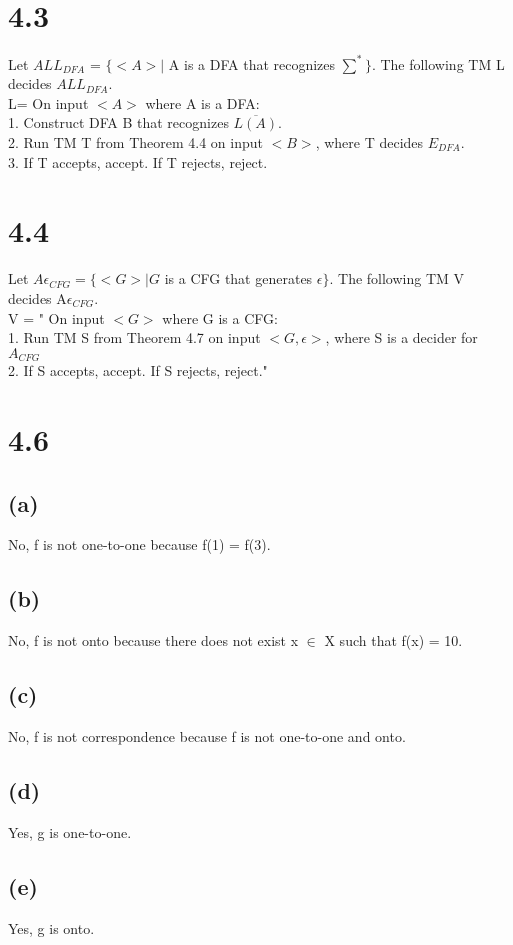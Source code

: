 \documentclass{scrartcl}
\begin{document}
\section*{4.3}
Let $ALL_{DFA}$ = $\{<A> \mid$ A is a DFA that recognizes $\sum^* \}$. The following TM L decides $ALL_{DFA}$.\\

L= On input $<A>$ where A is a DFA:\\
1. Construct DFA B that recognizes $\overline{L(A)}$.\\
2. Run TM T from Theorem 4.4 on input $<B>$, where T decides $E_{DFA}$.\\
3. If T accepts, accept. If T rejects, reject.


\section*{4.4}
Let $A\epsilon_{CFG} = \{<G> \mid G$ is a CFG that generates $\epsilon \}$. The following TM V decides A$\epsilon_{CFG}$.\\
V = " On input $<G>$ where G is a CFG:\\
1. Run TM S from Theorem 4.7 on input $<G,\epsilon>$, where S is a decider for $A_{CFG}$\\
2. If S accepts, accept. If S rejects, reject."

\section*{4.6}
\subsection*{(a)}
No, f is not one-to-one because f(1) = f(3).
\subsection*{(b)}
No, f is not onto because there does not exist x $\in$ X such that f(x) = 10.
\subsection*{(c)}
No, f is not correspondence because f is not one-to-one and onto.
\subsection*{(d)}
Yes, g is one-to-one.
\subsection*{(e)}
Yes, g is onto.
\end{document}
